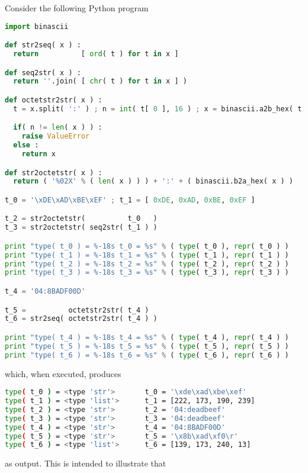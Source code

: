 Consider the following Python program

\begin{lstlisting}[language={Python}]
import binascii

def str2seq( x ) :
  return          [ ord( t ) for t in x ]

def seq2str( x ) :
  return ''.join( [ chr( t ) for t in x ] )

def octetstr2str( x ) :
  t = x.split( ':' ) ; n = int( t[ 0 ], 16 ) ; x = binascii.a2b_hex( t[ 1 ] )

  if( n != len( x ) ) :
    raise ValueError
  else :
    return x

def str2octetstr( x ) :
  return ( '%02X' % ( len( x ) ) ) + ':' + ( binascii.b2a_hex( x ) )

t_0 = '\xDE\xAD\xBE\xEF' ; t_1 = [ 0xDE, 0xAD, 0xBE, 0xEF ]

t_2 = str2octetstr(          t_0   )
t_3 = str2octetstr( seq2str( t_1 ) )

print "type( t_0 ) = %-18s t_0 = %s" % ( type( t_0 ), repr( t_0 ) )
print "type( t_1 ) = %-18s t_1 = %s" % ( type( t_1 ), repr( t_1 ) )
print "type( t_2 ) = %-18s t_2 = %s" % ( type( t_2 ), repr( t_2 ) )
print "type( t_3 ) = %-18s t_3 = %s" % ( type( t_3 ), repr( t_3 ) )

t_4 = '04:8BADF00D'

t_5 =          octetstr2str( t_4 )
t_6 = str2seq( octetstr2str( t_4 ) )

print "type( t_4 ) = %-18s t_4 = %s" % ( type( t_4 ), repr( t_4 ) )
print "type( t_5 ) = %-18s t_5 = %s" % ( type( t_5 ), repr( t_5 ) )
print "type( t_6 ) = %-18s t_6 = %s" % ( type( t_6 ), repr( t_6 ) )
\end{lstlisting}

\noindent
which, when executed, produces

\begin{lstlisting}[language={bash}]
type( t_0 ) = <type 'str'>       t_0 = '\xde\xad\xbe\xef'
type( t_1 ) = <type 'list'>      t_1 = [222, 173, 190, 239]
type( t_2 ) = <type 'str'>       t_2 = '04:deadbeef'
type( t_3 ) = <type 'str'>       t_3 = '04:deadbeef'
type( t_4 ) = <type 'str'>       t_4 = '04:8BADF00D'
type( t_5 ) = <type 'str'>       t_5 = '\x8b\xad\xf0\r'
type( t_6 ) = <type 'list'>      t_6 = [139, 173, 240, 13]
\end{lstlisting}

\noindent
as output.  This is intended to illustrate that

